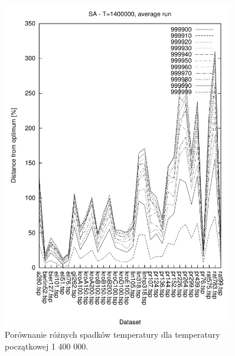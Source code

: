 \begin{figure}
\begin{center}
\includegraphics[width=0.9\textwidth]{wykresy/sa/sa_1400000_av}
\end{center}
\caption{Porównanie różnych spadków temperatury dla temperatury początkowej 1 400 000.}
\label{sa_1400000_av}
\end{figure}

